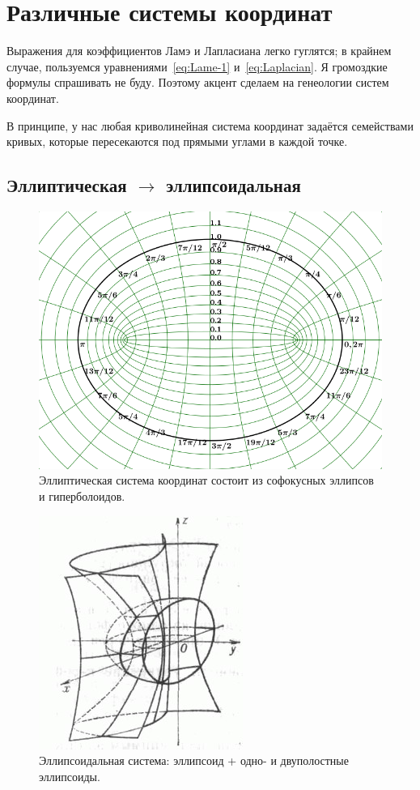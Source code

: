 \documentclass[12pt]{report}
\begin{document}
 \section{Различные системы координат}
 Выражения для коэффициентов Ламэ и Лапласиана легко гуглятся; в крайнем случае, пользуемся уравнениями~\eqref{eq:Lame-1} и~\eqref{eq:Laplacian}. Я громоздкие формулы спрашивать не буду. 
 Поэтому акцент сделаем на генеологии систем координат.
 
 В принципе, у нас любая криволинейная система координат задаётся семействами кривых, которые пересекаются под прямыми углами в каждой точке. 
 \subsection{Эллиптическая $\to$ эллипсоидальная}
\begin{figure}[h]\centering
 	\includegraphics[width=.8\linewidth]{elliptical_coordinates}
 	\caption{Эллиптическая система координат состоит из софокусных эллипсов и гиперболоидов.}
\end{figure}
\begin{figure}[h]\centering
 	\includegraphics[height=.35\paperheight]{ellipsoidal_cs}
 	\caption{Эллипсоидальная система: эллипсоид + одно- и двуполостные эллипсоиды.}
\end{figure}
\end{document}
